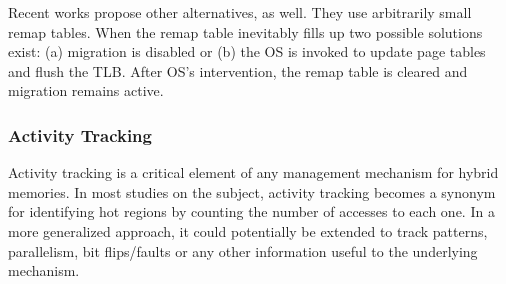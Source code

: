 
Recent works \cite{ramos-small-rt} propose other alternatives, as well.
They use arbitrarily small remap tables. When the remap table inevitably fills up two possible solutions exist: (a) migration is disabled or (b) the OS is invoked to update page tables and flush the TLB. After OS's intervention, the remap table is cleared and migration remains active.


%


\subsubsection{Activity Tracking}
\label{sec:tracking}

Activity tracking is a critical element of any management mechanism for hybrid memories. In most studies on the subject, activity tracking becomes a synonym for identifying hot regions by counting the number of accesses to each one. In a more generalized approach, it could potentially be extended to track patterns, parallelism, bit flips/faults or any other information useful to the underlying mechanism. %

